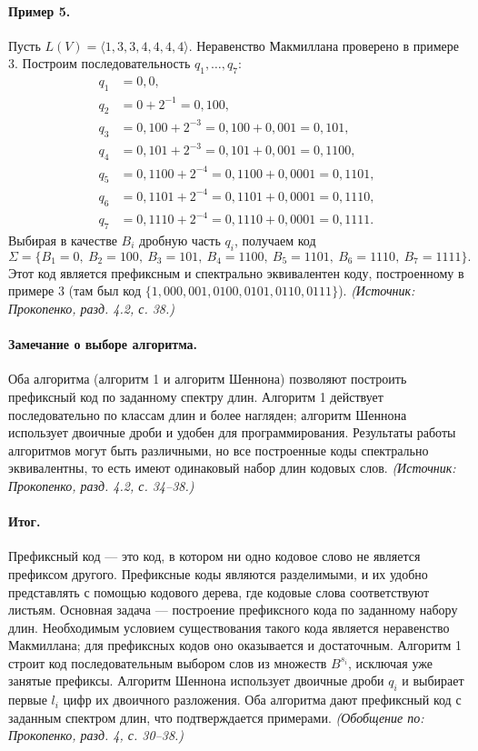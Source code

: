 \documentclass[a4paper,12pt]{article}
\begin{document}
\paragraph{Пример 5.}
Пусть \(L(V)=\langle1,3,3,4,4,4,4\rangle\). Неравенство Макмиллана проверено в примере 3. Построим последовательность \(q_1,\dots,q_7\):
\[
\begin{aligned}
q_1&=0{,}0,\\
q_2&=0+2^{-1}=0{,}100,\\
q_3&=0{,}100+2^{-3}=0{,}100+0{,}001=0{,}101,\\
q_4&=0{,}101+2^{-3}=0{,}101+0{,}001=0{,}1100,\\
q_5&=0{,}1100+2^{-4}=0{,}1100+0{,}0001=0{,}1101,\\
q_6&=0{,}1101+2^{-4}=0{,}1101+0{,}0001=0{,}1110,\\
q_7&=0{,}1110+2^{-4}=0{,}1110+0{,}0001=0{,}1111.
\end{aligned}
\]
Выбирая в качестве \(B_i\) дробную часть \(q_i\), получаем код
\[
\Sigma=\{B_1=0,\ B_2=100,\ B_3=101,\ B_4=1100,\ B_5=1101,\ B_6=1110,\ B_7=1111\}.
\]
Этот код является префиксным и спектрально эквивалентен коду, построенному в примере 3 (там был код \(\{1,000,001,0100,0101,0110,0111\}\)).
\textit{(Источник: Прокопенко, разд. 4.2, с. 38.)}

\paragraph{Замечание о выборе алгоритма.}
Оба алгоритма (алгоритм 1 и алгоритм Шеннона) позволяют построить префиксный код по заданному спектру длин. Алгоритм 1 действует последовательно по классам длин и более нагляден; алгоритм Шеннона использует двоичные дроби и удобен для программирования. Результаты работы алгоритмов могут быть различными, но все построенные коды спектрально эквивалентны, то есть имеют одинаковый набор длин кодовых слов.
\textit{(Источник: Прокопенко, разд. 4.2, с. 34--38.)}

\paragraph{Итог.}
Префиксный код — это код, в котором ни одно кодовое слово не является префиксом другого. Префиксные коды являются разделимыми, и их удобно представлять с помощью кодового дерева, где кодовые слова соответствуют листьям. Основная задача — построение префиксного кода по заданному набору длин. Необходимым условием существования такого кода является неравенство Макмиллана; для префиксных кодов оно оказывается и достаточным. Алгоритм 1 строит код последовательным выбором слов из множеств \(B^{s_i}\), исключая уже занятые префиксы. Алгоритм Шеннона использует двоичные дроби \(q_i\) и выбирает первые \(l_i\) цифр их двоичного разложения. Оба алгоритма дают префиксный код с заданным спектром длин, что подтверждается примерами.
\textit{(Обобщение по: Прокопенко, разд. 4, с. 30--38.)}
\end{document}
